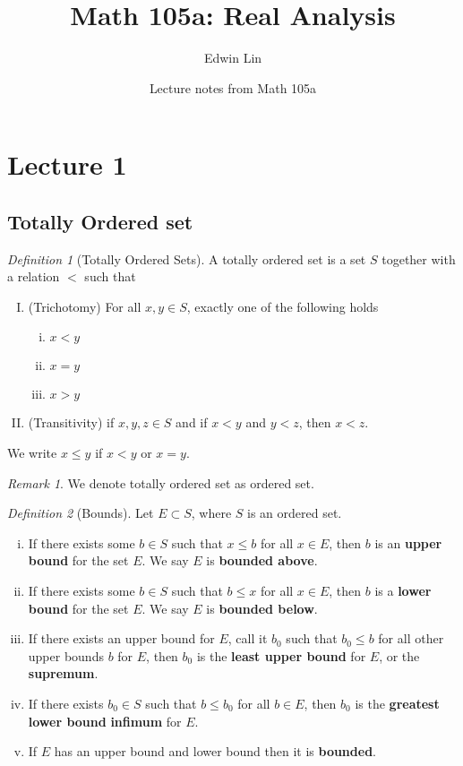\documentclass{article}
\title{Math 105a: Real Analysis}
\author{Edwin Lin}
\date{Lecture notes from Math 105a}
\theoremstyle{theorem}
\theoremstyle{definition}
\theoremstyle{proposition}
\theoremstyle{remark}
\newtheorem{definition}{Definition}[section]
\newtheorem*{remark}{Remark}
\begin{document}
\maketitle
\newpage
\tableofcontents
\newpage

\section{Lecture 1}
\subsection{Totally Ordered set}


\begin{definition}[Totally Ordered Sets]
A totally ordered set  is a set $S$ together with a relation $<$ such that
\begin{enumerate}[I.]
    \item (Trichotomy) For all $x,y \in S$, exactly one of the following holds 
    \begin{enumerate}[(i)]
        \item $x < y$
        \item $x = y$ 
        \item $x > y$
    \end{enumerate}
    \item (Transitivity) if $x,y,z \in S$ and if $x < y$ and $y < z$, then $x < z$.
\end{enumerate}
We write $x \leq y$ if $x < y$ or $x = y$.

\end{definition}
\begin{remark}
    We denote totally ordered set as ordered set.
\end{remark}

\begin{definition}[Bounds]
Let $E \subset S$, where $S$ is an ordered set.
\begin{enumerate}[(i)]
    \item If there exists some $b \in S$ such that $x \leq b$ for all $x \in E$, then $b$ is an \textbf{upper bound} for the set $E$. We say $E$ is \textbf{bounded above}.
    \item If there exists some $b \in S$ such that $b \leq x$ for all $x \in E$, then $b$ is a \textbf{lower bound} for the set $E$. We say $E$ is \textbf{bounded below}.
    \item If there exists an upper bound for $E$, call it $b_{0}$ such that $b_{0} \leq b$ for all other upper bounds $b$ for $E$, then $b_{0}$ is the \textbf{least upper bound} for $E$, or the \textbf{supremum}.
    \item If there exists $b_{0} \in S$ such that $b \leq b_{0}$ for all $b \in E$, then $b_{0}$ is the \textbf{greatest lower bound} \textbf{infimum} for $E$.
    \item If $E$ has an upper bound and lower bound then it is \textbf{bounded}.
\end{enumerate}
\end{definition}
\end{document}
